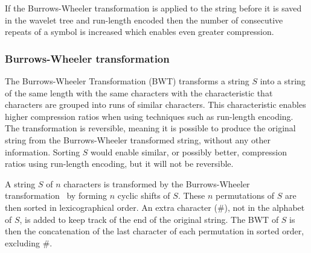 If the Burrows-Wheeler transformation is applied to the string before it is saved in the wavelet tree and run-length encoded then the number of consecutive repeats of a symbol is increased which enables even greater compression.

\subsubsection{Burrows-Wheeler transformation}
\label{sec:BWT}
The Burrows-Wheeler Transformation (BWT) transforms a string $S$ into a string of the same length with the same characters with the characteristic that characters are grouped into runs of similar characters.
This characteristic enables higher compression ratios when using techniques such as run-length encoding.
The transformation is reversible, meaning it is possible to produce the original string from the Burrows-Wheeler transformed string, without any other information.
Sorting $S$ would enable similar, or possibly better, compression ratios using run-length encoding, but it will not be reversible.

A string $S$ of $n$ characters is transformed by the Burrows-Wheeler transformation~ by forming $n$ cyclic shifts of $S$. 
These $n$ permutations of $S$ are then sorted in lexicographical order.
An extra character (\#), not in the alphabet of $S$, is added to keep track of the end of the original string.
The BWT of $S$ is then the concatenation of the last character of each permutation in sorted order, excluding $\#$.

